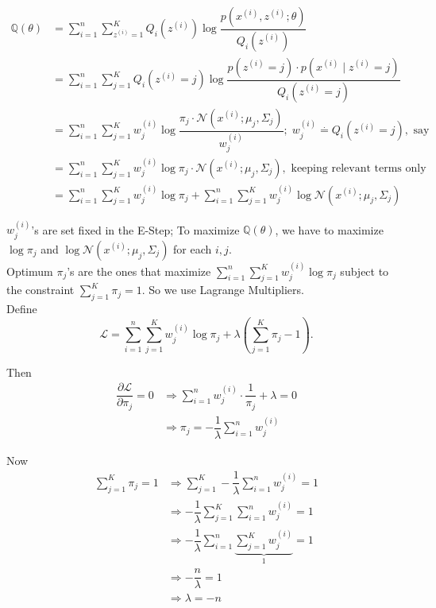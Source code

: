 \documentclass[11pt, a4paper]{article}
\begin{document}
\begin{align*}
\mathbb{Q}(\theta) &= \sum \limits_{i = 1}^{n} \sum \limits_{z^{(i)} = 1}^{K} Q_i(z^{(i)}) \log \dfrac{ p\left(x^{(i)}, z^{(i)}; \theta\right) }{ Q_i(z^{(i)}) } \\[0.5em]
&= \sum \limits_{i = 1}^{n} \sum \limits_{j = 1}^{K} Q_i(z^{(i)} = j) \log \dfrac{ p\left(z^{(i)} = j\right) \cdot p\left(x^{(i)} \mid z^{(i)} = j\right) }{ Q_i(z^{(i)} = j) } \\[0.5em]
&= \sum \limits_{i = 1}^{n} \sum \limits_{j = 1}^{K} w_j^{(i)} \log \dfrac{ \pi_j \cdot \mathcal{N}(x^{(i)}; \mu_j, \Sigma_j) }{ w_j^{(i)} }; \; w_j^{(i)} \overset{\cdot}{=} Q_i(z^{(i)} = j), \text{ say} \\[0.5em]
&= \sum \limits_{i = 1}^{n} \sum \limits_{j = 1}^{K} w_j^{(i)} \log \pi_j \cdot \mathcal{N}(x^{(i)}; \mu_j, \Sigma_j), \text{ keeping relevant terms only} \\[0.5em]
&= \sum \limits_{i = 1}^{n} \sum \limits_{j = 1}^{K} w_j^{(i)} \log \pi_j + \sum \limits_{i = 1}^{n} \sum \limits_{j = 1}^{K} w_j^{(i)} \log \mathcal{N}(x^{(i)}; \mu_j, \Sigma_j)
\end{align*}

$w_j^{(i)}$'s are set fixed in the E-Step; To maximize $\mathbb{Q}(\theta)$, we have to maximize $\log \pi_j$ and $\log \mathcal{N}(x^{(i)}; \mu_j, \Sigma_j)$ for each $i, j$. \\[0.5em]

Optimum $\pi_j$'s are the ones that maximize $\sum \limits_{i = 1}^{n} \sum \limits_{j = 1}^{K} w_j^{(i)} \log \pi_j$ subject to the constraint $\sum \limits_{j = 1}^{K} \pi_j = 1$. So we use Lagrange Multipliers. \\[0.5em]

Define $$\mathcal{L} = \sum_{i=1}^{n}\sum_{j=1}^{K} w_j^{(i)} \log \pi_j + \lambda \left( \sum_{j=1}^{K}\pi_j - 1 \right).$$

Then 
\begin{align*}
\dfrac{\partial \mathcal{L}}{\partial \pi_j} = 0 &\Rightarrow \sum_{i=1}^{n} w_j^{(i)} \cdot \dfrac{1}{\pi_j} + \lambda = 0 \\[0.5em]
&\Rightarrow \pi_j = - \dfrac{1}{\lambda} \sum \limits_{i=1}^{n}w_j^{(i)}
\end{align*}

Now
\begin{align*}
\sum \limits_{j = 1}^{K} \pi_j = 1 &\Rightarrow \sum \limits_{j = 1}^{K} - \dfrac{1}{\lambda} \sum \limits_{i=1}^{n}w_j^{(i)} = 1 \\[0.5em]
&\Rightarrow -\dfrac{1}{\lambda} \sum \limits_{j = 1}^{K} \sum \limits_{i=1}^{n}w_j^{(i)} = 1 \\[0.5em]
&\Rightarrow -\dfrac{1}{\lambda} \sum \limits_{i=1}^{n} \underbrace{\sum \limits_{j = 1}^{K} w_j^{(i)}}_{1} = 1 \\[0.5em]
&\Rightarrow -\dfrac{n}{\lambda} = 1 \\[0.5em]
&\Rightarrow \lambda = -n
\end{align*}
\end{document}
